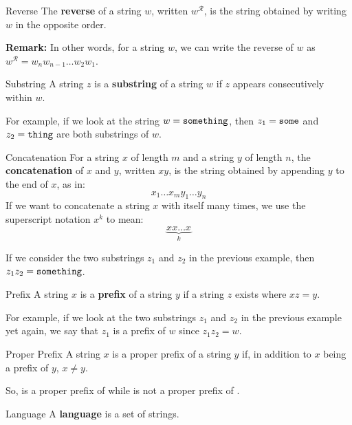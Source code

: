 \documentclass[letterpaper]{article}
\begin{document}
\begin{definition}{Reverse}{}
    The \textbf{reverse} of a string $w$, written $w^{\mathcal{R}}$, is the string obtained by writing $w$ in the opposite order.
\end{definition}
\textbf{Remark:} In other words, for a string $w$, we can write the reverse of $w$ as $w^{\mathcal{R}} = w_n w_{n - 1} \dots w_{2} w_{1}$. 

\begin{definition}{Substring}{}
    A string $z$ is a \textbf{substring} of a string $w$ if $z$ appears consecutively within $w$.
\end{definition}
For example, if we look at the string $w = \texttt{something}$, then $z_1 = \texttt{some}$ and $z_2 = \texttt{thing}$ are both substrings of $w$. 

\begin{definition}{Concatenation}{}
    For a string $x$ of length $m$ and a string $y$ of length $n$, the \textbf{concatenation} of $x$ and $y$, written $xy$, is the string obtained by appending $y$ to the end of $x$, as in: 
    \[x_1 \dots x_m y_1 \dots y_n\]
    If we want to concatenate a string $x$ with itself many times, we use the superscript notation $x^k$ to mean: 
    \[\underbrace{xx \dots x}_{k}\]
\end{definition}
If we consider the two substrings $z_1$ and $z_2$ in the previous example, then $z_1 z_2 = \texttt{something}$. 

\begin{definition}{Prefix}{}
    A string $x$ is a \textbf{prefix} of a string $y$ if a string $z$ exists where $xz = y$.
\end{definition}
For example, if we look at the two substrings $z_1$ and $z_2$ in the previous example yet again, we say that $z_1$ is a prefix of $w$ since $z_1 z_2 = w$. 

\begin{definition}{Proper Prefix}{}
    A string $x$ is a proper prefix of a string $y$ if, in addition to $x$ being a prefix of $y$, $x \neq y$.
\end{definition}
So,  is a proper prefix of  while  is not a proper prefix of .

\begin{definition}{Language}{}
    A \textbf{language} is a set of strings. 
\end{definition}
\end{document}
